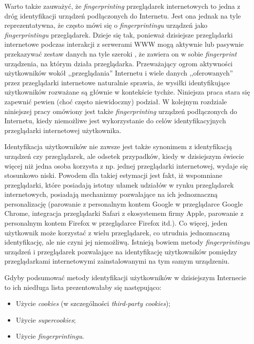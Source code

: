 Warto także zauważyć, że \emph{fingerprinting} przeglądarek internetowych to
jedna z dróg identyfikacji urządzeń podłączonych do Internetu. Jest ona jednak
na tyle reprezentatywna, że często mówi się o \emph{fingerprintingu} urządzeń
jako \emph{fingerprintingu} przeglądarek. Dzieje się tak, ponieważ dzisiejsze
przeglądarki internetowe podczas interakcji z serwerami WWW mogą aktywnie lub
pasywnie przekazywać zestaw danych na tyle szeroki \cite{eckersley2010unique},
że zawiera on w sobie \emph{fingerprint} urządzenia, na którym działa
przeglądarka. Przeważający ogrom aktywności użytkowników wokół ,,przeglądania''
Internetu i wiele danych ,,oferowanych'' przez przeglądarki internetowe
naturalnie sprawia, że wysiłki identyfikujące użytkowników rozważane są głównie
w kontekście tychże. Niniejsza praca stara się zapewnić pewien (choć często
niewidoczny) podział. W kolejnym rozdziale niniejszej pracy omówiony jest także
\emph{fingerprinting} urządzeń podłączonych do Internetu, kiedy niemożliwe jest
wykorzystanie do celów identyfikacyjnych przeglądarki internetowej użytkownika.

Identyfikacja użytkowników nie zawsze jest także synonimem z identyfikacją
urządzeń czy przeglądarek, ale odsetek przypadków, kiedy w dzisiejszym świecie
więcej niż jedna osoba korzysta z np. jednej przeglądarki internetowej, wydaje
się stosunkowo niski. Powodem dla takiej estymacji jest fakt, iż wspomniane
przeglądarki, które posiadają istotny ułamek udziałów w rynku przeglądarek
internetowych, posiadają mechanizmy pozwalające na ich jednoznaczną
personalizację (parowanie z personalnym kontem Google w przeglądarce Google
Chrome, integracja przeglądarki Safari z ekosystemem firmy Apple, parowanie z
personalnym kontem Firefox w przeglądarce Firefox itd.). Co więcej, jeden
użytkownik może korzystać z wielu przeglądarek, co utrudnia jednoznaczną
identyfikację, ale nie czyni jej niemożliwą. Istnieją bowiem metody
\emph{fingerprintingu} urządzeń i przeglądarek pozwalające na identyfikację
użytkowników pomiędzy przeglądarkami internetowymi zainstalowanymi na tym samym
urządzeniu.

Gdyby podsumować metody identyfikacji użytkowników w dzisiejszym Internecie to
ich niedługa lista prezentowałaby się następująco:
\begin{itemize}
	\item Użycie \emph{cookies} (w szczególności \emph{third-party cookies});
	\item Użycie \emph{supercookies};
	\item Użycie \emph{fingerprintingu}.
\end{itemize}

